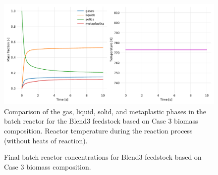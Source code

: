\begin{figure}[H]
    \centering
    \includegraphics[width=\textwidth]{figures/blend3-case3-phases-temp.pdf}
    \caption{Comparison of the gas, liquid, solid, and metaplastic phases in the batch reactor for the Blend3 feedstock based on Case 3 biomass composition. Reactor temperature during the reaction process (without heats of reaction).}
    \label{fig:blend3-case3-phases-temp}
\end{figure}

\begin{figure}[H]
    \centering
    \caption{Final batch reactor concentrations for Blend3 feedstock based on Case 3 biomass composition.}
    \label{fig:blend3-case3-final}
\end{figure}
